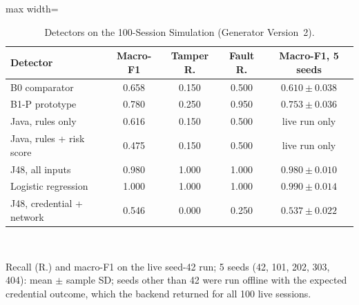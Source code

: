 \documentclass[sigconf,screen]{acmart}
\begin{document}
\begin{table}[tbp]
\centering
\footnotesize
\caption{Detectors on the 100-Session Simulation (Generator Version~2).}
\label{tab:b0_vs_b1}
\setlength{\tabcolsep}{4pt}
\begin{adjustbox}{max width=\columnwidth}
\begin{tabular}{l c c c c}
\toprule
Detector & Macro-F1 & Tamper R. & Fault R. & Macro-F1, 5 seeds \\
\midrule
B0 comparator & 0.658 & 0.150 & 0.500 & $0.610\pm0.038$ \\
B1-P prototype & 0.780 & 0.250 & 0.950 & $0.753\pm0.036$ \\
Java, rules only & 0.616 & 0.150 & 0.500 & live run only \\
Java, rules + risk score & 0.475 & 0.150 & 0.500 & live run only \\
J48, all inputs & 0.980 & 1.000 & 1.000 & $0.980\pm0.010$ \\
Logistic regression & 1.000 & 1.000 & 1.000 & $0.990\pm0.014$ \\
J48, credential + network & 0.546 & 0.000 & 0.250 & $0.537\pm0.022$ \\
\bottomrule
\end{tabular}
\end{adjustbox}
\\[2pt]
\parbox{0.97\linewidth}{\footnotesize Recall (R.) and macro-F1 on the live seed-42 run; 5 seeds (42, 101, 202, 303,
404): mean $\pm$ sample SD; seeds other than 42 were run offline with the expected credential outcome, which the
backend returned for all 100 live sessions.}
\end{table}
\end{document}
